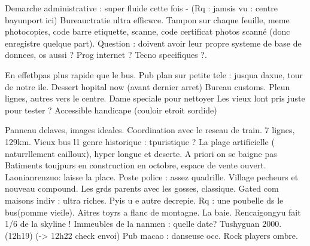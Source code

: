 Demarche administrative : super fluide cette fois -
(Rq : jamsis vu : centre bayunport ici)
Bureauctratie ultra efficwce. Tampon sur chaque feuille, meme photocopies, code barre etiquette, scanne, code certificat photos scanné (donc enregistre quelque part). Question : doivent avoir leur propre systeme de base de donnees, os aussi ? Prog internet ? Tecno specifiques ?.

En effetbpas plus rapide que le bus.
Pub plan sur petite tele : jusqua daxue, tour de notre ile.
Dessert hopital now (avant dernier arret)
Bureau customs.
Pleun lignes, autres vers le centre.
Dame speciale pour nettoyer
Les vieux lont pris juste pour tester ?
Accessible handicape (couloir etroit sordide)

Panneau delaves, images ideales.
Coordination avec le reseau de train.
7 lignes, 129km.
Vieux bus l1 genre historique : tpuristique ?
La plage artificielle ( naturrllement cailloux), hyper longue et deserte. A priori on se baigne pas
Batiments toujpurs en construction en octobre, espace de vente ouvert.
Laonianrenzuo: laisse la place.
Poste police : assez quadrille. Village pecheurs et nouveau compound.
Les grds parents avec les gosses, classique.
Gated com maisons indiv : ultra riches. Pyis u e autre decrepie.
Rq : une poubelle ds le bus(pomme vieile).
Aitres toyrs a flanc de montagne.
La baie. Rencaigongyu fait 1/6 de la skyline !
Immeubles de la nanmen : quelle date? Tushyguan 2000.
(12h19)
(-> 12h22 check envoi)
Pub macao : danseuse occ. Rock players ombre.
















